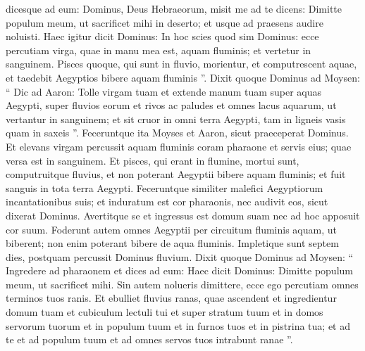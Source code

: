 \begin{biblechapter}
\begin{biblechapter}
\begin{biblechapter}
\begin{biblechapter}
\begin{biblechapter}
\begin{biblechapter}
\begin{biblechapter}
\verse dicesque ad eum: Dominus, Deus Hebraeorum, misit me ad te dicens: Dimitte populum meum, ut sacrificet mihi in deserto; et usque ad praesens audire noluisti. 
\verse Haec igitur dicit Dominus: In hoc scies quod sim Dominus: ecce percutiam virga, quae in manu mea est, aquam fluminis; et vertetur in sanguinem. 
\verse Pisces quoque, qui sunt in fluvio, morientur, et computrescent aquae, et taedebit Aegyptios bibere aquam fluminis ”.
 \verse Dixit quoque Dominus ad Moysen: “ Dic ad Aaron: Tolle virgam tuam et extende manum tuam super aquas Aegypti, super fluvios eorum et rivos ac paludes et omnes lacus aquarum, ut vertantur in sanguinem; et sit cruor in omni terra Aegypti, tam in ligneis vasis quam in saxeis ”. 
\verse Feceruntque ita Moyses et Aaron, sicut praeceperat Dominus. Et elevans virgam percussit aquam fluminis coram pharaone et servis eius; quae versa est in sanguinem. 
\verse Et pisces, qui erant in flumine, mortui sunt, computruitque fluvius, et non poterant Aegyptii bibere aquam fluminis; et fuit sanguis in tota terra Aegypti.
 \verse Feceruntque similiter malefici Aegyptiorum incantationibus suis; et induratum est cor pharaonis, nec audivit eos, sicut dixerat Dominus. 
\verse Avertitque se et ingressus est domum suam nec ad hoc apposuit cor suum. 
\verse Foderunt autem omnes Aegyptii per circuitum fluminis aquam, ut biberent; non enim poterant bibere de aqua fluminis. 
\verse Impletique sunt septem dies, postquam percussit Dominus fluvium.
 \verse Dixit quoque Dominus ad Moysen: “ Ingredere ad pharaonem et dices ad eum: Haec dicit Dominus: Dimitte populum meum, ut sacrificet mihi. 
\verse Sin autem nolueris dimittere, ecce ego percutiam omnes terminos tuos ranis. 
\verse Et ebulliet fluvius ranas, quae ascendent et ingredientur domum tuam et cubiculum lectuli tui et super stratum tuum et in domos servorum tuorum et in populum tuum et in furnos tuos et in pistrina tua; 
\verse et ad te et ad populum tuum et ad omnes servos tuos intrabunt ranae ”.
 

\end{biblechapter}
\end{biblechapter}
\end{biblechapter}
\end{biblechapter}
\end{biblechapter}
\end{biblechapter}
\end{biblechapter}
